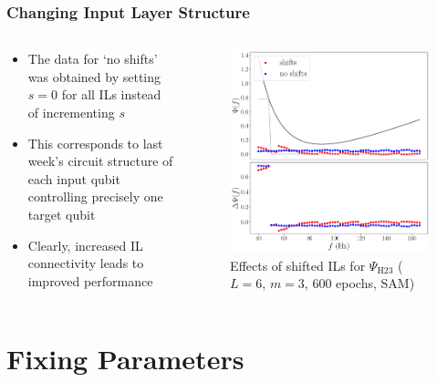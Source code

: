 \documentclass{beamer}
\begin{document}
\begin{frame}
\frametitle{Changing Input Layer Structure}
\begin{columns}
\begin{column}{0.5\textwidth}
\begin{itemize}
\item The data for `no shifts' was obtained by setting  $s=0$ for all ILs instead of incrementing $s$
\item This corresponds to last week's circuit structure of each input qubit controlling precisely one target qubit
\item Clearly, \alert{increased IL connectivity leads to improved performance}
\end{itemize}
\end{column}
\begin{column}{0.5\textwidth}
\begin{figure}
\centering 
\includegraphics[width=\textwidth]{im/phase_shift_comp_psi_m3}
\caption{Effects of shifted ILs for $\Psi_\text{H23}$ ($L=6$, $m=3$, 600 epochs, SAM)}
\end{figure}
\end{column}
\end{columns}
\end{frame}


\section{Fixing Parameters}
\end{document}
